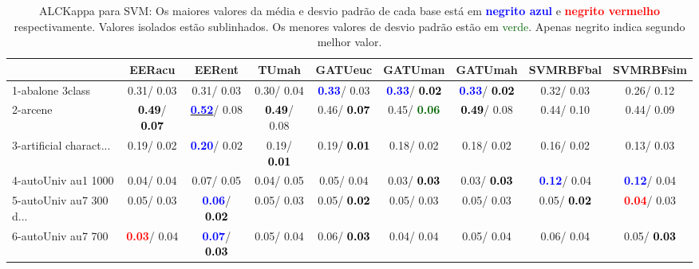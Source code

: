 \begin{table}[h]
\caption{ALCKappa para SVM: Os maiores valores da média e desvio padrão de cada base está em \textcolor{blue}{\textbf{negrito azul}} e \textcolor{red}{\textbf{negrito vermelho}} respectivamente. Valores isolados estão sublinhados. Os menores valores de desvio padrão estão em \textcolor{darkgreen}{verde}. Apenas negrito indica segundo melhor valor.}
\begin{center}\begin{tabular}{lc|c|c|c|c|c|c|c}
 & EERacu & EERent & TUmah & \textbf{GATUeuc} & \textbf{GATUman} & \textbf{GATUmah} & SVMRBFbal & SVMRBFsim\\ \hline 1-abalone 3class &   0.31/  0.03 &   0.31/  0.03 &   0.30/  0.04 & \textcolor{blue}{\textbf{  0.33}}/  0.03 & \textcolor{blue}{\textbf{  0.33}}/\textcolor{black}{\textbf{  0.02}} & \textcolor{blue}{\textbf{  0.33}}/\textcolor{black}{\textbf{  0.02}} &   0.32/  0.03 &   0.26/  0.12 \\
2-arcene & \textcolor{black}{\textbf{  0.49}}/\textcolor{black}{\textbf{  0.07}} & \underline{\textcolor{blue}{\textbf{  0.52}}}/  0.08 & \textcolor{black}{\textbf{  0.49}}/  0.08 &   0.46/\textcolor{black}{\textbf{  0.07}} &   0.45/\textcolor{darkgreen}{\textbf{  0.06}} & \textcolor{black}{\textbf{  0.49}}/  0.08 &   0.44/  0.10 &   0.44/  0.09 \\
3-artificial charact... &   0.19/  0.02 & \textcolor{blue}{\textbf{  0.20}}/  0.02 &   0.19/\textcolor{black}{\textbf{  0.01}} &   0.19/\textcolor{black}{\textbf{  0.01}} &   0.18/  0.02 &   0.18/  0.02 &   0.16/  0.02 &   0.13/  0.03 \\
4-autoUniv au1 1000 &   0.04/  0.04 &   0.07/  0.05 &   0.04/  0.05 &   0.05/  0.04 &   0.03/\textcolor{black}{\textbf{  0.03}} &   0.03/\textcolor{black}{\textbf{  0.03}} & \textcolor{blue}{\textbf{  0.12}}/  0.04 & \textcolor{blue}{\textbf{  0.12}}/  0.04 \\
5-autoUniv au7 300 d... &   0.05/  0.03 & \textcolor{blue}{\textbf{  0.06}}/\textcolor{black}{\textbf{  0.02}} &   0.05/  0.03 &   0.05/\textcolor{black}{\textbf{  0.02}} &   0.05/  0.03 &   0.05/  0.03 &   0.05/\textcolor{black}{\textbf{  0.02}} & \textcolor{red}{\textbf{  0.04}}/  0.03 \\
6-autoUniv au7 700 & \textcolor{red}{\textbf{  0.03}}/  0.04 & \textcolor{blue}{\textbf{  0.07}}/\textcolor{black}{\textbf{  0.03}} &   0.05/  0.04 &   0.06/\textcolor{black}{\textbf{  0.03}} &   0.04/  0.04 &   0.05/  0.04 &   0.06/  0.04 &   0.05/\textcolor{black}{\textbf{  0.03}} \\

\end{tabular}
\end{center}
\end{table}
